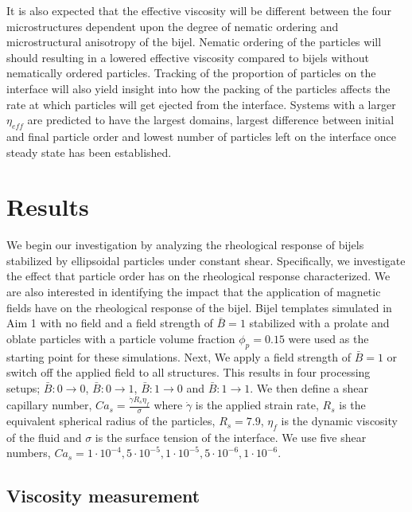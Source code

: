 It is also expected that the effective viscosity will be different between the four microstructures dependent upon the 
degree of nematic ordering and microstructural anisotropy of the bijel. Nematic ordering of the particles will 
should resulting in a lowered effective viscosity compared to bijels without nematically 
ordered particles. \cite{xu_relation_2013, vermant_flow-induced_2005} Tracking of the proportion of particles on the 
interface will also yield insight into how the packing of the particles affects the rate at which particles will get 
ejected from the interface. Systems with a larger $\eta_{eff}$ are predicted to have the largest domains, largest 
difference between initial and final particle order and lowest number of particles left on the interface once steady 
state has been established. 

\section{Results}\label{sec:results_p3}

We begin our investigation by analyzing the rheological response of bijels stabilized by ellipsoidal particles under constant shear.
Specifically, we investigate the effect that particle order has on the rheological response characterized. We are also interested in
identifying the impact that the application of magnetic fields have on the rheological response of the bijel. 
Bijel templates simulated in Aim 1 with no field and a field strength of $\bar{B} = 1$ stabilized with a prolate and oblate particles with a 
particle volume fraction $\phi_p = 0.15$ were used as the starting point for these simulations. Next, We apply a field strength of
$\bar{B} = 1$ or switch off the applied field to all structures. This results in four processing setups; $\bar{B}:0\rightarrow 0$, $\bar{B}:0\rightarrow 1$,
$\bar{B}:1\rightarrow 0$ and $\bar{B}:1\rightarrow 1$. We then define a shear capillary number,  $Ca_s = \frac{\dot{\gamma} R_{s} \eta_{f}}{\sigma}$ where 
$\dot{\gamma}$ is the applied strain rate, $R_s$ is the equivalent spherical radius of the particles, $R_s = 7.9$, $\eta_f$ is the dynamic viscosity of the 
fluid and $\sigma$ is the surface tension of the interface. We use five shear numbers, $Ca_s = 1\cdot10^{-4}, 5\cdot10^{-5}, 1\cdot10^{-5}, 5\cdot10^{-6}, 1\cdot10^{-6}$.

\subsection{Viscosity measurement}

